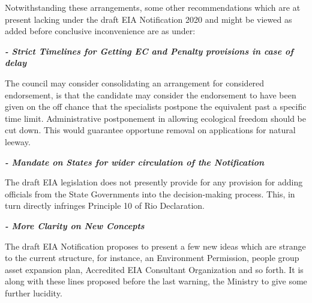 \begin{multicols}{2}
\noi
Notwithstanding these arrangements, some other recommendations which are at present
lacking under the draft EIA Notification 2020 and might be viewed as added before
conclusive inconvenience are as under:

{\it\bfseries - Strict Timelines for Getting EC and Penalty provisions in case of delay}

\noi
The council may consider consolidating an arrangement for considered endorsement, is that
the candidate may consider the endorsement to have been given on the off chance that the
specialists postpone the equivalent past a specific time limit. Administrative postponement in
allowing ecological freedom should be cut down. This would guarantee opportune removal
on applications for natural leeway.

{\it\bfseries - Mandate on States for wider circulation of the Notification}

\noi
The draft EIA legislation does not presently provide for any provision for adding officials
from the State Governments into the decision-making process. This, in turn directly infringes
Principle 10 of Rio Declaration. 

{\it\bfseries - More Clarity on New Concepts}

\noi
The draft EIA Notification proposes to present a few new ideas which are strange to the
current structure, for instance, an Environment Permission, people group asset expansion
plan, Accredited EIA Consultant Organization and so forth. It is along with these lines
proposed before the last warning, the Ministry to give some further lucidity.

\end{multicols}
